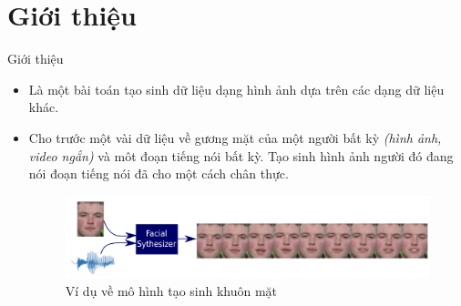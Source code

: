 \section{Giới thiệu}\label{sec:intro}
\frame{\tableofcontents[currentsection]}
\begin{frame}{Giới thiệu}

\begin{itemize}
    \item Là một bài toán tạo sinh dữ liệu dạng hình ảnh dựa trên các dạng dữ liệu khác.
    \item Cho trước một vài dữ liệu về gương mặt của một người bất kỳ \textit{(hình ảnh, video ngắn)} và môt đoạn tiếng nói bất kỳ. Tạo sinh hình ảnh người đó đang nói đoạn tiếng nói đã cho một cách chân thực.
\begin{figure}[H]
    \centering
    \includegraphics[width=13cm]{images/intro.png}
    \caption{Ví dụ về mô hình tạo sinh khuôn mặt}
    \label{fig:example}
\end{figure}
\end{itemize}
\end{frame}
